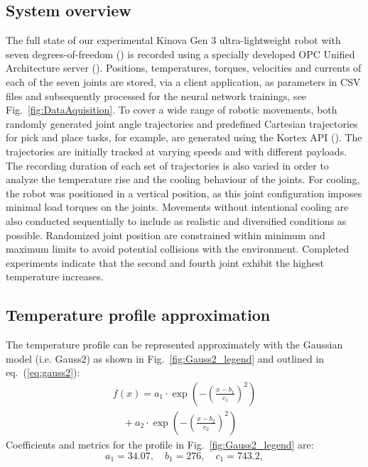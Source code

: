 \documentclass{ifacconf}
\begin{document}
\subsection{System overview}
The full state of our experimental Kinova Gen 3 ultra-lightweight robot with seven degrees-of-freedom (\cite{kinova}) is recorded using a specially developed OPC Unified Architecture server (\cite{Girke}). 
Positions, temperatures, torques, velocities and currents of each of the seven joints are stored, via a client application, as parameters in CSV files and subsequently processed for the neural network trainings, see Fig.~\ref{fig:DataAquisition}.
To cover a wide range of robotic movements, both randomly generated joint angle trajectories and predefined Cartesian trajectories for pick and place tasks, for example, are generated using the Kortex API (\cite{kortexAPI}). 
The trajectories are initially tracked at varying speeds and with different payloads. The recording duration of each set of trajectories is also varied in order to analyze the temperature rise and the cooling behaviour of the joints. 
For cooling, the robot was positioned in a vertical position, as this joint configuration imposes minimal load torques on the joints. Movements without intentional cooling are also conducted sequentially to include as realistic and diversified conditions as possible.
 Randomized joint position are constrained within minimum and maximum limits to avoid potential collisions with the environment. 
Completed experiments indicate that  the second and fourth joint exhibit the highest temperature increases. 

\subsection{Temperature profile approximation}
The temperature profile can be represented approximately with the Gaussian model (i.e. Gauss2) as shown in Fig.~\ref{fig:Gauss2_legend} and outlined in eq.~(\ref{eq:gauss2}):
\begin{equation} \label{eq:gauss2}
  \begin{array}{l}
  f(x) = a_1 \cdot \exp\left( -\left( \frac{x - b_1}{c_1} \right)^2 \right) \\
  \quad + a_2 \cdot \exp\left( -\left( \frac{x - b_2}{c_2} \right)^2 \right)
  \end{array}
  \end{equation}
Coefficients and metrics for the  profile in Fig.~\ref{fig:Gauss2_legend} are:
\[
a_1 = 34.07, \quad b_1 = 276, \quad  c_1 = 743.2,
\]
\end{document}
